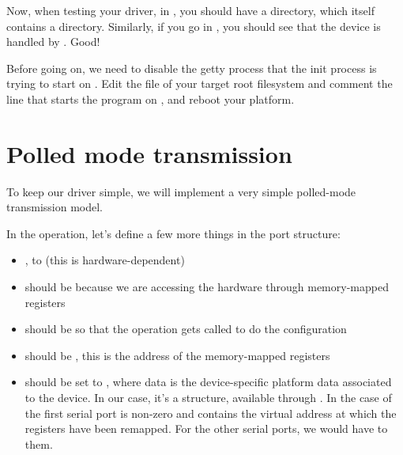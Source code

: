 Now, when testing your driver, in
, you should have a
 directory, which itself contains a 
directory. Similarly, if you go in , you
should see that the  device is handled by
. Good!

Before going on, we need to disable the getty process that the init
process is trying to start on . Edit the
 file of your target root filesystem and comment
the line that starts the  program on , and
reboot your platform.

\section{Polled mode transmission}

To keep our driver simple, we will implement a very simple polled-mode
transmission model.

In the  operation, let's define a few more things in the port
structure:

\begin{itemize}

\item {}, to  (this is hardware-dependent)

\item {} should be  because we are
  accessing the hardware through memory-mapped registers

\item {} should be  so that the
   operation gets called to do the configuration

\item {} should be , this is
  the address of the memory-mapped registers

\item {} should be set to , where data is
  the device-specific platform data associated to the device. In our
  case, it's a  structure, available through
  . In the case of the first serial port
   is non-zero and contains the virtual address at
  which the registers have been remapped. For the other serial ports,
  we would have to  them.

\end{itemize}


